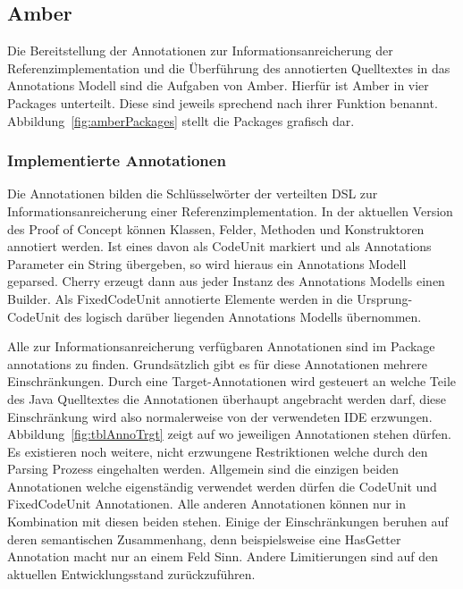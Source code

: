 \documentclass[12pt,oneside,a4paper,parskip]{scrbook}
\begin{document}
\subsection{Amber}

Die Bereitstellung der Annotationen zur Informationsanreicherung der Referenzimplementation und die Überführung des annotierten Quelltextes in das Annotations Modell sind die Aufgaben von Amber. Hierfür ist Amber in vier Packages unterteilt. Diese sind jeweils sprechend nach ihrer Funktion benannt. Abbildung~\ref{fig:amberPackages} stellt die Packages grafisch dar.

\subsubsection{Implementierte Annotationen}

Die Annotationen bilden die Schlüsselwörter der verteilten DSL zur Informationsanreicherung einer Referenzimplementation. In der aktuellen Version des Proof of Concept können Klassen, Felder, Methoden und Konstruktoren annotiert werden. Ist eines davon als CodeUnit markiert und als Annotations Parameter ein String übergeben, so wird hieraus ein Annotations Modell geparsed. Cherry erzeugt dann aus jeder Instanz des Annotations Modells einen Builder. Als FixedCodeUnit annotierte Elemente werden in die Ursprung-CodeUnit des logisch darüber liegenden Annotations Modells übernommen.

Alle zur Informationsanreicherung verfügbaren Annotationen sind im Package annotations zu finden. Grundsätzlich gibt es für diese Annotationen mehrere Einschränkungen. Durch eine Target-Annotationen wird gesteuert an welche Teile des Java Quelltextes die Annotationen überhaupt angebracht werden darf, diese Einschränkung wird also normalerweise von der verwendeten IDE erzwungen. Abbildung~\ref{fig:tblAnnoTrgt} zeigt auf wo jeweiligen Annotationen stehen dürfen. Es existieren noch weitere, nicht erzwungene Restriktionen welche durch den Parsing Prozess eingehalten werden. Allgemein sind die einzigen beiden Annotationen welche eigenständig verwendet werden dürfen die CodeUnit und FixedCodeUnit Annotationen. Alle anderen Annotationen können nur in Kombination mit diesen beiden stehen. Einige der Einschränkungen beruhen auf deren semantischen Zusammenhang, denn beispielsweise eine HasGetter Annotation macht nur an einem Feld Sinn. Andere Limitierungen sind auf den aktuellen Entwicklungsstand zurückzuführen.
\end{document}
